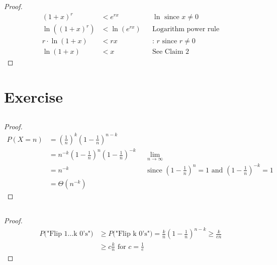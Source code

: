 \documentclass[12pt,a4paper]{article}
\begin{document}
\begin{proof}
\begin{align}
  (1+x)^r &< e^{rx} && \ln \text{ since } x \neq 0\\
  \ln((1+x)^r) &< \ln(e^{rx}) && \text{Logarithm power rule}\\
  r \cdot \ln(1+x) &< rx && \text{: $r$ since } r \neq 0\\
  \ln(1+x) &< x && \text{See Claim 2}
\end{align}
\end{proof}


\section{Exercise}
\subsection{}
\begin{proof}

\begin{align}
  P(X=n) &= \left(\frac{1}{n}\right)^{k}\left(1-\frac{1}{n}\right)^{n-k} \\
  &= n^{-k}\left(1-\frac{1}{n}\right)^{n}\left(1-\frac{1}{n}\right)^{-k} && \lim_{n \to \infty} \\
  &= n^{-k} && \text{since } \left(1-\frac{1}{n}\right)^{n} = 1 \text{ and }\left(1-\frac{1}{n}\right)^{-k}=1 \\
  &= \Theta(n^{-k})
\end{align}

\end{proof}

\subsection{}
\begin{proof}
\begin{align}
  P \text{("Flip 1\ldots k 0's")} & \geq P \text{("Flip k 0's")} = \frac{k}{n}\left(1-\frac{1}{n}\right)^{n-k} \geq \frac{k}{en} \\
  & \geq c\frac{k}{n} \text{ for } c = \frac{1}{e}
\end{align}

\end{proof}
\end{document}
